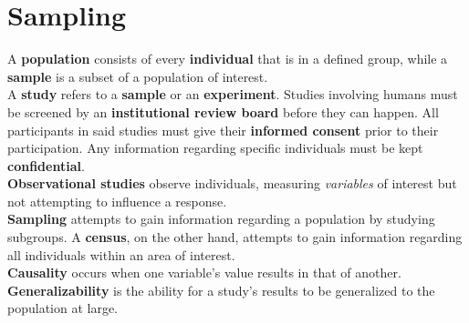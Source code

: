 \documentclass[../AP_Statistics.tex]{subfiles}
\begin{document}
	\chapter{Sampling}
		A \textbf{population} consists of every \textbf{individual} that is in a defined group, while a \textbf{sample} is a subset of a population of interest. \\
		A \textbf{study} refers to a \textbf{sample} or an \textbf{experiment}.
		Studies involving humans must be screened by an \textbf{institutional review board} before they can happen. All participants in said studies must give their \textbf{informed consent} prior to their participation. Any information regarding specific individuals must be kept \textbf{confidential}. \\
		\textbf{Observational studies} observe individuals, measuring \emph{variables} of interest but not attempting to influence a response. \\
		\textbf{Sampling} attempts to gain information regarding a population by studying subgroups. A \textbf{census}, on the other hand, attempts to gain information regarding all individuals within an area of interest. \\
		\textbf{Causality} occurs when one variable's value results in that of another. \\
		\textbf{Generalizability} is the ability for a study's results to be generalized to the population at large.
\end{document}
